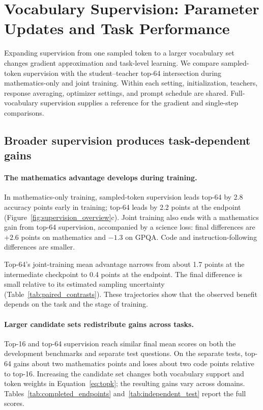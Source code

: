 \section{Vocabulary Supervision: Parameter Updates and Task Performance}
\label{sec:density}

Expanding supervision from one sampled token to a larger vocabulary set changes gradient approximation and task-level learning. We compare sampled-token supervision with the student--teacher top-64 intersection during mathematics-only and joint training. Within each setting, initialization, teachers, response averaging, optimizer settings, and prompt schedule are shared. Full-vocabulary supervision supplies a reference for the gradient and single-step comparisons.

\subsection{Broader supervision produces task-dependent gains}

\paragraph{The mathematics advantage develops during training.}
In mathematics-only training, sampled-token supervision leads top-64 by 2.8 accuracy points early in training; top-64 leads by 2.2 points at the endpoint (Figure~\ref{fig:supervision_overview}c). Joint training also ends with a mathematics gain from top-64 supervision, accompanied by a science loss: final differences are $+2.6$ points on mathematics and $-1.3$ on GPQA. Code and instruction-following differences are smaller.

Top-64's joint-training mean advantage narrows from about 1.7 points at the intermediate checkpoint to 0.4 points at the endpoint. The final difference is small relative to its estimated sampling uncertainty (Table~\ref{tab:paired_contrasts}). These trajectories show that the observed benefit depends on the task and the stage of training.

\paragraph{Larger candidate sets redistribute gains across tasks.}
Top-16 and top-64 supervision reach similar final mean scores on both the development benchmarks and separate test questions. On the separate tests, top-64 gains about two mathematics points and loses about two code points relative to top-16. Increasing the candidate set changes both vocabulary support and token weights in Equation~\ref{eq:topk}; the resulting gains vary across domains. Tables~\ref{tab:completed_endpoints} and~\ref{tab:independent_test} report the full scores.

